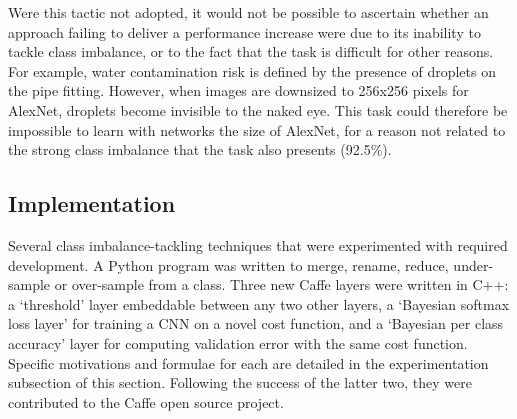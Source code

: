 \documentclass[a4paper,11pt]{article}
\begin{document}
Were this tactic not adopted, it would not be possible to ascertain whether an approach failing to deliver a performance increase were due to its inability to tackle class imbalance, or to the fact that the task is difficult  for other reasons. For example, water contamination risk is defined by the presence of droplets on the pipe fitting. However, when images are downsized to 256x256 pixels for AlexNet, droplets become invisible to the naked eye. This task could therefore be impossible to learn with networks the size of AlexNet, for a reason not related to the strong class imbalance that the task also presents (92.5\%). \\

\subsection{Implementation}

Several class imbalance-tackling techniques that were experimented with required development. A Python program was written to merge, rename, reduce, under-sample or over-sample from a class. Three new Caffe layers were written in C++: a `threshold' layer embeddable between any two other layers, a `Bayesian softmax loss layer' for training a CNN on a novel cost function, and a `Bayesian per class accuracy' layer for computing validation error with the same cost function. Specific motivations and formulae for each are detailed in the experimentation subsection of this section. Following the success of the latter two, they were contributed to the Caffe open source project.

\end{document}
